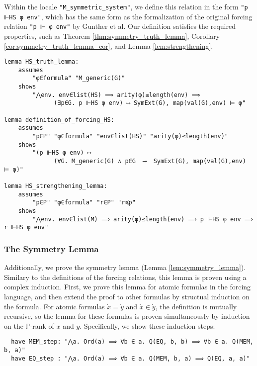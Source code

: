 \documentclass{report}
\newenvironment{isaframe}{\begin{mdframed}[topline=false, rightline=false, bottomline=false]}{\end{mdframed}}
\begin{document}
Within the locale \texttt{"M\_symmetric\_system"},
we define this relation in the form \texttt{"p ⊩HS φ env"},
which has the same form as the formalization of the original forcing relation \texttt{"p ⊩ φ env"} by Gunther et al.
Our definition satisfies the required properties, such as Theorem \ref{thm:symmetry_truth_lemma}, Corollary \ref{cor:symmetry_truth_lemma_cor}, and Lemma \ref{lem:strengthening}.

\begin{isaframe}
\begin{verbatim}
lemma HS_truth_lemma:
    assumes 
        "φ∈formula" "M_generic(G)"
    shows 
        "⋀env. env∈list(HS) ⟹ arity(φ)≤length(env) ⟹ 
              (∃p∈G. p ⊩HS φ env) ⟷ SymExt(G), map(val(G),env) ⊨ φ"

lemma definition_of_forcing_HS:
    assumes
        "p∈P" "φ∈formula" "env∈list(HS)" "arity(φ)≤length(env)"
    shows
        "(p ⊩HS φ env) ⟷
              (∀G. M_generic(G) ∧ p∈G  ⟶  SymExt(G), map(val(G),env) ⊨ φ)"

lemma HS_strengthening_lemma:
    assumes 
        "p∈P" "φ∈formula" "r∈P" "r≼p"
    shows
        "⋀env. env∈list(M) ⟹ arity(φ)≤length(env) ⟹ p ⊩HS φ env ⟹ r ⊩HS φ env"
\end{verbatim}
\end{isaframe}

\subsubsection{The Symmetry Lemma}
Additionally, we prove the symmetry lemma (Lemma \ref{lem:symmetry_lemma}).
Similary to the definitions of the forcing relations, this lemma is proven using a complex induction.
First, we prove this lemma for atomic formulas in the forcing language, 
and then extend the proof to other formulas by structual induction on the formula.
For atomic formulas $\dot{x} = \dot{y}$ and $\dot{x} \in \dot{y}$, 
the definition is mutually recursive, so the lemma for these formulas is proven simultaneously
by induction on the $\mathbb{P}$-rank of $\dot{x}$ and $\dot{y}$.
Specifically, we show these induction steps:

\begin{isaframe}
\begin{verbatim}
  have MEM_step: "⋀a. Ord(a) ⟹ ∀b ∈ a. Q(EQ, b, b) ⟹ ∀b ∈ a. Q(MEM, b, a)"  
  have EQ_step : "⋀a. Ord(a) ⟹ ∀b ∈ a. Q(MEM, b, a) ⟹ Q(EQ, a, a)"   
\end{verbatim}
\end{isaframe}
\end{document}
